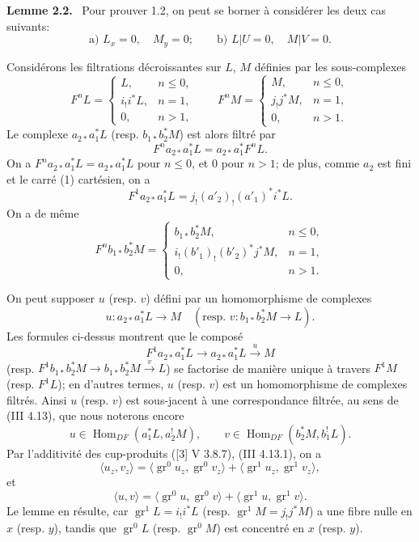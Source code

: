 \documentclass[11pt]{article}
\newenvironment{statement}[1]{\par\medskip\noindent\textbf{#1.}\ }{\par\medskip}
\DeclareMathOperator{\Hom}{Hom}
\providecommand{\Hom}{\operatorname{Hom}}
\providecommand{\Hom}{\operatorname{Hom}}
\begin{document}
\begin{statement}{Lemme 2.2}
Pour prouver 1.2, on peut se borner à considérer les deux cas suivants:
\[
\text{a) } L_x=0,\quad M_y=0;\qquad
\text{b) } L|U=0,\quad M|V=0 .
\]
\end{statement}

Considérons les filtrations décroissantes sur $L$, $M$ définies par les sous-complexes
\[
F^nL=
\begin{cases}
L,& n\le 0,\\
i_!i^*L,& n=1,\\
0,& n>1,
\end{cases}
\qquad
F^nM=
\begin{cases}
M,& n\le 0,\\
j_!j^*M,& n=1,\\
0,& n>1.
\end{cases}
\]
Le complexe $a_{2*}a_1^*L$ (resp. $b_{1*}b_2^*M$) est alors filtré par
\[
F^n a_{2*}a_1^*L=a_{2*}a_1^*F^nL.
\]
On a $F^n a_{2*}a_1^*L=a_{2*}a_1^*L$ pour $n\le 0$, et $0$ pour $n>1$; de plus, comme $a_2$ est fini et le carré (1) cartésien, on a
\[
F^1a_{2*}a_1^*L=j_!(a'_2)_!(a'_1)^*i^*L.
\]
On a de même
\[
F^n b_{1*}b_2^*M=
\begin{cases}
b_{1*}b_2^*M,& n\le 0,\\
i_!(b'_1)_!(b'_2)^*j^*M,& n=1,\\
0,& n>1.
\end{cases}
\]

On peut supposer $u$ (resp. $v$) défini par un homomorphisme de complexes
\[
u:a_{2*}a_1^*L\longrightarrow M
\quad
(\text{resp. }v:b_{1*}b_2^*M\longrightarrow L).
\]
Les formules ci-dessus montrent que le composé
\[
F^1a_{2*}a_1^*L\longrightarrow a_{2*}a_1^*L\xrightarrow{u}M
\]
(resp. $F^1b_{1*}b_2^*M\to b_{1*}b_2^*M\xrightarrow{v}L$) se factorise de manière unique à travers $F^1M$ (resp. $F^1L$); en d'autres termes, $u$ (resp. $v$) est un homomorphisme de complexes filtrés. Ainsi $u$ (resp. $v$) est sous-jacent à une correspondance filtrée, au sens de (III 4.13), que nous noterons encore
\[
u\in\Hom_{DF}(a_1^*L,a_2^!M),\qquad
v\in\Hom_{DF}(b_2^*M,b_1^!L).
\]
Par l'additivité des cup-produits ([3] V 3.8.7), (III 4.13.1), on a
\[
\langle u_z,v_z\rangle
 =\langle \operatorname{gr}^0u_z,\operatorname{gr}^0v_z\rangle
 +\langle \operatorname{gr}^1u_z,\operatorname{gr}^1v_z\rangle,
\]
et
\[
\langle u,v\rangle
 =\langle \operatorname{gr}^0u,\operatorname{gr}^0v\rangle
 +\langle \operatorname{gr}^1u,\operatorname{gr}^1v\rangle.
\]
Le lemme en résulte, car $\operatorname{gr}^1L=i_!i^*L$ (resp. $\operatorname{gr}^1M=j_!j^*M$) a une fibre nulle en $x$ (resp. $y$), tandis que $\operatorname{gr}^0L$ (resp. $\operatorname{gr}^0M$) est concentré en $x$ (resp. $y$).
\end{document}
